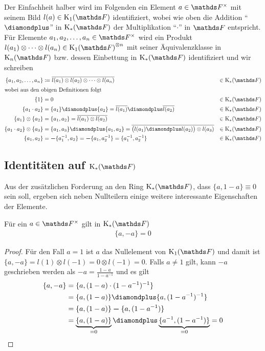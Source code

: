 \documentclass[ngerman,fontsize=11pt, paper=a4, parskip=half, titlepage=true, toc=bib]{scrartcl}
\begin{document}
\begin{Not}
  Der Einfachheit halber wird im Folgenden
  ein Element $a\in\Fx$ mit seinem Bild
  $l(a)\in\K_1(\F)$ identifiziert, wobei wie oben 
  die Addition \enquote{$\p$} in $\KF$
  der Multiplikation \enquote{$\cdot$} in $\F$ entspricht.
  Für Elemente $a_1,a_2,\dotsc,a_n\in\Fx$ wird
  ein Produkt $l(a_1)\otimes\dotsb \otimes l(a_n)\in{\KoF}^{\otimes n}$ 
  mit seiner Äquivalenzklasse in $\KnF$ 
  bzw. dessen Einbettung in $\KF$ identifiziert
  und wir schreiben
  \begin{align*}
    \{ a_1,a_2,\dotsc,a_n\}
    &\coloneqq \overline{l(a_1)\otimes l(a_2)\otimes \dotsb \otimes
      l(a_n)} 
    &\in\KF\\ 
    \intertext{wobei aus den obigen Definitionen folgt}
    \{1\}&=0 &\in\KF\\
    \{ a_1 \cdot a_2 \}
    &=  \{a_1\}\p \{a_2\} = \overline{l(a_1)} \p \overline{l(a_2)}  &\in\KF \\
    \{ a_1 \} \otimes \{ a_2 \}
    &= \{ a_1,a_2 \} = \overline{l(a_1)\otimes l(a_2)} &\in\KF \\
    \{ a_1\cdot a_2 \} \otimes \{ a_3 \}
    &= \{ a_1,a_3 \} \p \{a_1, a_2\} 
      = \overline{\big(l(a_1)\p l(a_2)\big) \otimes l(a_3)} &\in\KF\\
    \{ a_1, a_2\} 
    &= \m\{a_1^{-1},a_2\} = \m\{a_1,a_2^{-1}\} 
      = \{a_1^{-1},a_2^{-1}\} &\in\KF                               
  \end{align*}
\end{Not}

\subsection{Identitäten auf $\KF$}
Aus der zusätzlichen Forderung an den Ring $\KF$, 
dass $\{a,1-a\}\equiv 0$ sein soll, ergeben sich neben Nullteilern 
einige weitere interessante Eigenschaften der Elemente.

\begin{Lem}\label{identitaetminus}
  Für ein $a \in\Fx$ gilt in $\KF$
  \begin{gather*}
    \{a,-a\}=0
  \end{gather*}
  \begin{proof}
    Für den Fall $a=1$ ist $a$ das Nullelement von $\KoF$ und damit ist 
    $\{a,-a\}=l(1)\otimes l(-1) = 0\otimes l(-1) = 0$.
    Falls $a\neq 1$ gilt, kann $-a$ geschrieben werden als
    $-a=\frac{1-a}{1-a^{-1}}$ und es gilt
    \begin{align*}
      \{a,-a\} &= \{a,(1-a)\cdot (1-a^{-1})^{-1}\}\\
               &= \{a,(1-a)\}\p\{a,(1-a^{-1})^{-1}\} \\
               &= \{a,(1-a)\}\m\{a,(1-a^{-1})\} \\
               &= \underbrace{\{a,(1-a)\}}_{=0}
                 \p\underbrace{\{a^{-1},(1-a^{-1})\}}_{=0} 
                 =0
    \end{align*}
  \end{proof}
\end{Lem}
\end{document}
